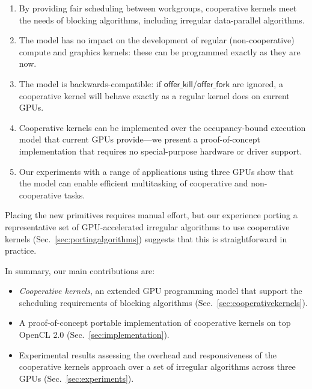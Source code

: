 \documentclass[numbers,nocopyrightspace,10pt]{sigplanconf}
\newcommand{\mysec}{Sec.~}
\newcommand{\offerfork}{\mathsf{offer\_fork}}
\newcommand{\offerkill}{\mathsf{offer\_kill}}
\begin{document}
\begin{enumerate}

\item By providing fair scheduling between workgroups, cooperative
  kernels meet the needs of blocking algorithms, including irregular
  data-parallel algorithms.

\item The model has no impact on the development of regular
  (non-cooperative) compute and graphics kernels: these can be programmed exactly as they
  are now.

\item The model is backwards-compatible: if $\offerkill$/$\offerfork$ are ignored, a cooperative kernel will behave
  exactly as a regular kernel does on current GPUs.

\item Cooperative kernels can be implemented over the occupancy-bound
  execution model that current GPUs provide---we present a
  proof-of-concept implementation that requires
  no special-purpose hardware or driver support.

\item Our experiments with a range of applications using three GPUs show that the model can enable efficient multitasking of cooperative and non-cooperative
  tasks.

\end{enumerate}

Placing the new primitives requires manual effort, but our experience porting a representative set of
GPU-accelerated irregular algorithms to use cooperative kernels
(\mysec\ref{sec:portingalgorithms}) suggests that this is straightforward in practice.

In summary, our main contributions are:

\begin{itemize}

\item \emph{Cooperative kernels}, an extended GPU programming model that support the scheduling requirements of blocking algorithms (\mysec\ref{sec:cooperativekernels}). 

\item A proof-of-concept portable implementation of cooperative
  kernels on top OpenCL 2.0
  (\mysec\ref{sec:implementation}).

\item Experimental results assessing the overhead and responsiveness of the cooperative kernels approach over a set of irregular algorithms across three GPUs (\mysec\ref{sec:experiments}).

\end{itemize}
\end{document}
